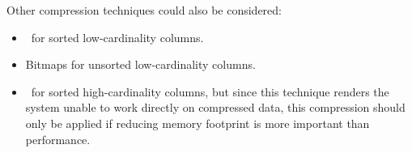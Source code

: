 Other compression techniques could also be considered:
\begin{itemize}
  \item \rle~for sorted low-cardinality columns.
  \item Bitmaps for unsorted low-cardinality columns.
  \item \dele~for sorted high-cardinality columns, but since this technique renders the system unable to work directly on compressed data, this compression should only be applied if reducing memory footprint is more important than performance.
\end{itemize}
